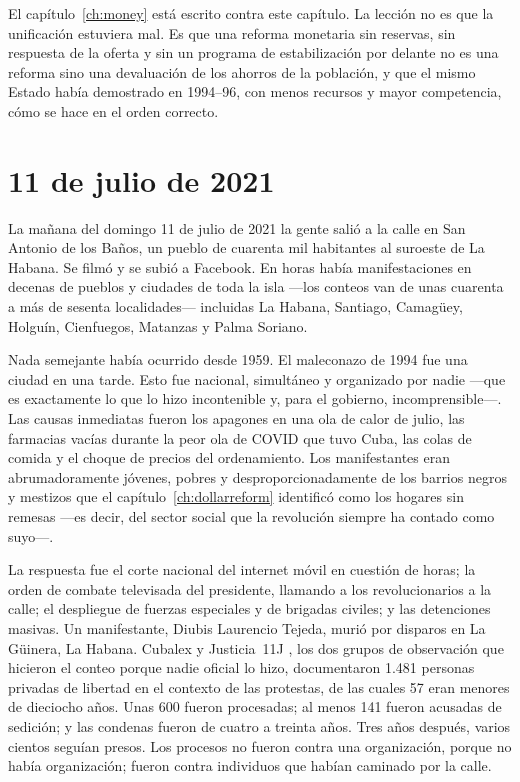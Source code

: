 El capítulo~\ref{ch:money} está escrito contra este capítulo. La lección no es que
la unificación estuviera mal. Es que una reforma monetaria sin reservas, sin
respuesta de la oferta y sin un programa de estabilización por delante no es una
reforma sino una devaluación de los ahorros de la población, y que el mismo Estado
había demostrado en 1994--96, con menos recursos y mayor competencia, cómo se hace
en el orden correcto.

\section{11 de julio de 2021}

La mañana del domingo 11 de julio de 2021 la gente salió a la calle en San Antonio
de los Baños, un pueblo de cuarenta mil habitantes al suroeste de La Habana. Se
filmó y se subió a Facebook. En horas había manifestaciones en decenas de pueblos y
ciudades de toda la isla ---los conteos van de unas cuarenta a más de sesenta
localidades--- incluidas La Habana, Santiago, Camagüey, Holguín, Cienfuegos,
Matanzas y Palma Soriano.\unv{}

Nada semejante había ocurrido desde 1959. El maleconazo de 1994 fue una ciudad en
una tarde. Esto fue nacional, simultáneo y organizado por nadie ---que es
exactamente lo que lo hizo incontenible y, para el gobierno, incomprensible---.
Las causas inmediatas fueron los apagones en una ola de calor de julio, las
farmacias vacías durante la peor ola de COVID que tuvo Cuba, las colas de comida y
el choque de precios del ordenamiento. Los manifestantes eran abrumadoramente
jóvenes, pobres y desproporcionadamente de los barrios negros y mestizos que el
capítulo~\ref{ch:dollarreform} identificó como los hogares sin remesas ---es
decir, del sector social que la revolución siempre ha contado como suyo---.

La respuesta fue el corte nacional del internet móvil en cuestión de horas; la
orden de combate televisada del presidente, llamando a los revolucionarios a la
calle; el despliegue de fuerzas especiales y de brigadas civiles; y las
detenciones masivas. Un manifestante, Diubis Laurencio Tejeda, murió por disparos
en La Güinera, La Habana. Cubalex y Justicia~11J \citep{justicia11j}, los dos
grupos de observación que hicieron el conteo porque nadie oficial lo hizo,
documentaron 1.481 personas privadas de libertad en el contexto de las protestas,
de las cuales 57 eran menores de dieciocho años. Unas 600 fueron procesadas; al
menos 141 fueron acusadas de sedición; y las condenas fueron de cuatro a treinta
años. Tres años después, varios cientos seguían presos. Los procesos no fueron
contra una organización, porque no había organización; fueron contra individuos
que habían caminado por la calle.

